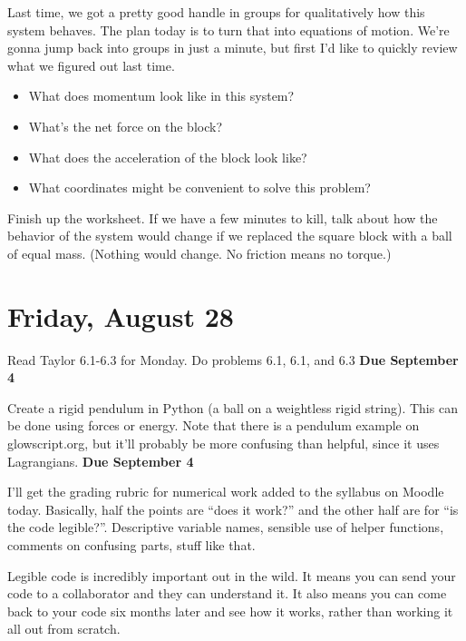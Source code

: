 \documentclass[10pt]{article}
\renewenvironment{quote}{\begin{shaded*}\begin{oldquote}}{\end{oldquote}\end{shaded*}}
\begin{document}
Last time, we got a pretty good handle in groups for qualitatively how this system behaves. The plan today is to turn that into equations of motion. We're gonna jump back into groups in just a minute, but first I'd like to quickly review what we figured out last time. 

\begin{itemize}

    \item What does momentum look like in this system?
    
    \item What's the net force on the block?
    
    \item What does the acceleration of the block look like?
    
    \item What coordinates might be convenient to solve this problem?
    
\end{itemize}

Finish up the worksheet. If we have a few minutes to kill, talk about how the behavior of the system would change if we replaced the square block with a ball of equal mass. (Nothing would change. No friction means no torque.)

\section*{Friday, August 28}

\begin{quote}
    Read Taylor 6.1-6.3 for Monday. Do problems 6.1, 6.1, and 6.3 \textbf{Due September 4}
\end{quote}

\begin{quote}
    Create a rigid pendulum in Python (a ball on a weightless rigid string). This can be done using forces or energy. Note that there is a pendulum example on glowscript.org, but it'll probably be more confusing than helpful, since it uses Lagrangians. \textbf{Due September 4}
    
    I'll get the grading rubric for numerical work added to the syllabus on Moodle today. Basically, half the points are ``does it work?'' and the other half are for ``is the code legible?''. Descriptive variable names, sensible use of helper functions, comments on confusing parts, stuff like that. 

    Legible code is incredibly important out in the wild. It means you can send your code to a collaborator and they can understand it. It also means you can come back to your code six months later and see how it works, rather than working it all out from scratch. 
\end{quote}
\end{document}
